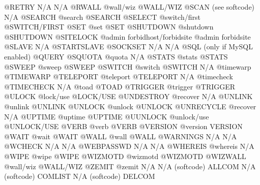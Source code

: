 \documentclass[letterpaper,10pt,english]{sphinxmanual}
\begin{document}
\begin{sphinxVerbatim}[commandchars=\\\{\}]
@RETRY                  N/A                            N/A
@RWALL                  @wall/wiz                      @WALL/WIZ
@SCAN                   (see softcode)                 N/A
@SEARCH                 @search                        @SEARCH
@SELECT                 @switch/first                  @SWITCH/FIRST
@SET                    @set                           @SET
@SHUTDOWN               @shutdown                      @SHUTDOWN
@SITELOCK               @admin forbid\PYGZus{}host/forbid\PYGZus{}site @admin forbid\PYGZus{}site
@SLAVE                  N/A                            @STARTSLAVE
@SOCKSET                N/A                            N/A
@SQL                    (only if MySQL enabled)        @QUERY
@SQUOTA                 @quota                         N/A
@STATS                  @stats                         @STATS
@SWEEP                  @sweep                         @SWEEP
@SWITCH                 @switch                        @SWITCH
N/A                     @timewarp                      @TIMEWARP
@TELEPORT               @teleport                      @TELEPORT
N/A                     @timecheck                     @TIMECHECK
N/A                     @toad                          @TOAD
@TRIGGER                @trigger                       @TRIGGER
@ULOCK                  @lock/use                      @LOCK/USE
@UNDESTROY              @recover                       N/A
@UNLINK                 @unlink                        @UNLINK
@UNLOCK                 @unlock                        @UNLOCK
@UNRECYCLE              @recover                       N/A
@UPTIME                 @uptime                        @UPTIME
@UUNLOCK                @unlock/use                    @UNLOCK/USE
@VERB                   @verb                          @VERB
@VERSION                @version                       VERSION
@WAIT                   @wait                          @WAIT
@WALL                   @wall                          @WALL
@WARNINGS               N/A                            N/A
@WCHECK                 N/A                            N/A
@WEBPASSWD              N/A                            N/A
@WHEREIS                @whereis                       N/A
@WIPE                   @wipe                          @WIPE
@WIZMOTD                @wizmotd                       @WIZMOTD
@WIZWALL                @wall/wiz                      @WALL/WIZ
@ZEMIT                  @zemit                         N/A
N/A                     (softcode)                     ALLCOM
N/A                     (softcode)                     COMLIST
N/A                     (softcode)                     DELCOM

\end{sphinxVerbatim}
\end{document}

